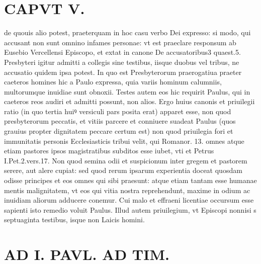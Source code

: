 \documentclass{article}
\begin{document}
\begin{pages}
\section*{CAPVT  V. }
\marginpar{[ p.815 ]}\pstart de quouis alio potest, praeterquam in hoc casu verbo Dei expresso: si modo, qui accusant non sunt omnino infames personae: vt est praeclare responsum ab Eusebio Vercellensi Episcopo, et extat in canone De accusatoribus3 quaest.5. Presbyteri igitur admitti a collegis sine testibus, iisque duobus vel tribus, ne accusatio quidem ipsa potest. In quo est Presbyterorum praerogatiua praeter caeteros homines hic a Paulo expressa, quia variis hominum calumniis, multorumque inuidiae sunt obnoxii. Testes autem eos hic requirit Paulus, qui in caeteros reos audiri et admitti possunt, non alios. Ergo huius canonis et priuilegii ratio (in quo tertia huiꝰ versiculi pars posita erat) apparet esse, non quod presbyterorum peccatis, et vitiis parcere et conniuere suadeat Paulus (quos grauius propter dignitatem peccare certum est) non quod priuilegia fori et immunitatis personis Ecclesiasticis tribui velit, qui Romanor. 13. omnes atque etiam pastores ipsos magistratibus subditos esse iubet, vti et Petrus I.Pet.2.vers.17. Non quod semina odii et suspicionum inter gregem et pastorem serere, aut alere cupiat: sed quod rerum ipsarum experientia doceat quosdam odisse principes et eos omnes qui sibi praesunt: atque etiam tantam esse humanae mentis malignitatem, vt eos qui vitia nostra reprehendunt, maxime in odium ac inuidiam aliorum adducere conemur. Cui malo et effraeni licentiae occursum esse sapienti isto remedio voluit Paulus. Illud autem priuilegium, vt Episcopi nonnisi s septuaginta testibus, isque non Laicis homini.  \pend
\section*{AD I. PAVL. AD TIM. }
\marginpar{[ p.310 ]}\pstart {}
{}

\end{pages}
\end{document}
